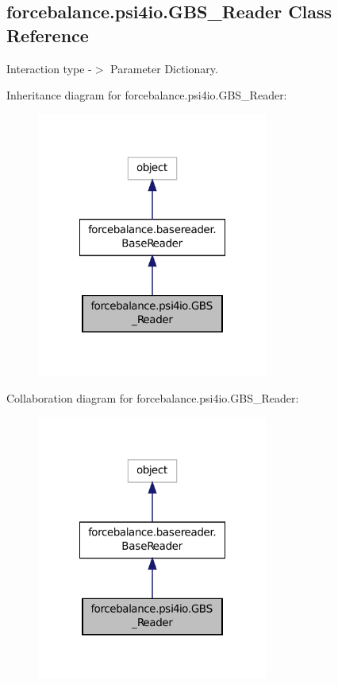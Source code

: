 \hypertarget{classforcebalance_1_1psi4io_1_1GBS__Reader}{\subsection{forcebalance.\-psi4io.\-G\-B\-S\-\_\-\-Reader Class Reference}
\label{classforcebalance_1_1psi4io_1_1GBS__Reader}
}


Interaction type -\/$>$ Parameter Dictionary.  




Inheritance diagram for forcebalance.\-psi4io.\-G\-B\-S\-\_\-\-Reader\-:\nopagebreak
\begin{figure}[H]
\begin{center}
\leavevmode
\includegraphics[width=216pt]{classforcebalance_1_1psi4io_1_1GBS__Reader__inherit__graph}
\end{center}
\end{figure}


Collaboration diagram for forcebalance.\-psi4io.\-G\-B\-S\-\_\-\-Reader\-:\nopagebreak
\begin{figure}[H]
\begin{center}
\leavevmode
\includegraphics[width=216pt]{classforcebalance_1_1psi4io_1_1GBS__Reader__coll__graph}
\end{center}
\end{figure}
